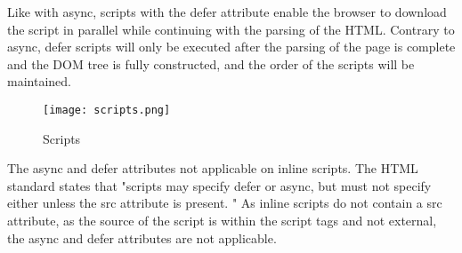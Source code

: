 
Like with async, scripts with the defer attribute enable the browser to download the script in parallel while continuing with the parsing of the HTML.
Contrary to async, defer scripts will only be executed after the parsing of the page is complete and the DOM tree is fully constructed,  and the order of the scripts will be maintained.  %


\begin{figure}[h!]
\begin{center}
\texttt{[image: scripts.png]}
\caption{Scripts}
\label{img:latency}
\end{center}
\end{figure}


The async and defer attributes not applicable on inline scripts.
The HTML standard states that  "scripts may specify defer or async, but must not specify either unless the src attribute is present. " %
As inline scripts do not contain a src attribute, as the source of the script is within the script tags and not external, the async and defer attributes are not applicable.














